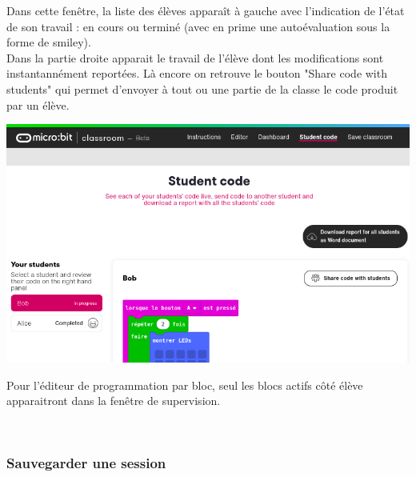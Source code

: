 \begin{methode}
        Dans cette fenêtre, la liste des élèves apparaît à gauche avec l'indication 
        de l'état de son travail : en cours ou terminé (avec en prime une autoévaluation sous la
        forme de smiley).\\
        Dans la partie droite apparait le travail de l'élève dont les modifications sont instantannément
        reportées. Là encore on retrouve le bouton "Share code with students" qui permet d'envoyer à tout
        ou une partie de la classe le code produit par un élève.

    \vspace{5mm}
    
    \centerline{\includegraphics[width=0.6\linewidth]{res/classroom_studentCode2.png}}
    


\end{methode}

\begin{remarque}
    Pour l'éditeur de programmation par bloc, seul les blocs actifs côté élève
    apparaitront dans la fenêtre de supervision.
    
\end{remarque}


\newpage
\vspace{5mm}~\\

\subsubsection{Sauvegarder une session}

